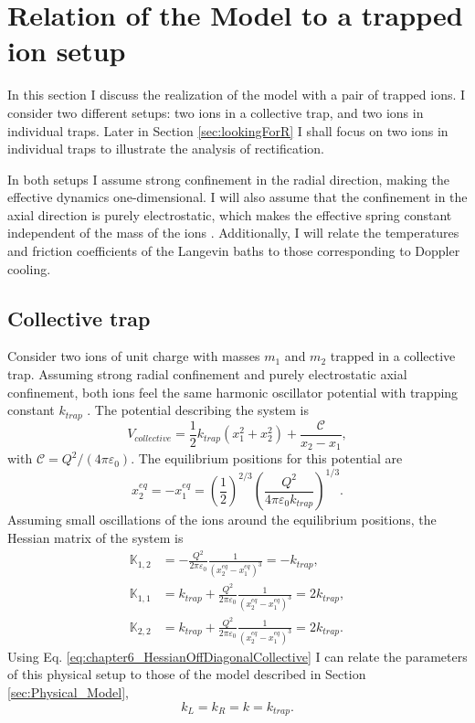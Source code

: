 \section{Relation of the Model to a trapped ion setup \label{sec:TrappedIonSetUp}}
%
In this section I discuss the realization of the model with  a pair of trapped ions. I consider two different setups: two ions in a collective trap, and two ions in individual traps. Later in Section \ref{sec:lookingForR} I shall focus on two ions in individual traps to illustrate the analysis of rectification.

In both setups I assume strong confinement in the radial direction, making the effective dynamics one-dimensional. I will also assume that the confinement in the axial direction is purely electrostatic, which makes the effective spring constant independent of the mass of the ions \cite{Leibfried2003}. Additionally, I will relate the temperatures and friction coefficients of the Langevin baths to those corresponding to Doppler cooling.
%
%
\subsection{Collective trap}
%
%
Consider two ions of unit charge with masses $m_1$ and $m_2$ trapped in a collective trap. Assuming strong radial confinement and purely electrostatic axial confinement, both ions feel the same harmonic oscillator potential with trapping constant $k_{trap}$ \cite{Leibfried2003}. The potential describing the system is
%
\begin{equation}
  V_{collective} = \frac{1}{2}k_{trap} \left( x_1^2 + x_2^2\right) + \frac{\mathcal{C}}{x_2-x_1},
\end{equation}
%
with $\mathcal{C}={Q^2}/({4\pi\varepsilon_0})$. The equilibrium positions for this potential are
%
\begin{equation}
  x_2^{eq} = -x_1^{eq} =
  \label{eq:chapter6_equilibriumPositionsCollectiveTrap}\left(\frac{1}{2}\right)^{2/3} \left(\frac{Q^2}{4\pi\varepsilon_0 k_{trap}}\right)^{1/3}.
\end{equation}
%
Assuming small oscillations of the ions around the equilibrium positions, the Hessian matrix of the system is
%
\begin{align}
  \mathbb{K}_{1,2} &= -\frac{Q^2}{2\pi\varepsilon_0}\frac{1}{(x_2^{eq}-x_1^{eq})^3} = -k_{trap},\nonumber
  \\
  \mathbb{K}_{1,1} &= k_{trap} + \frac{Q^2}{2\pi\varepsilon_0}\frac{1}{(x_2^{eq}-x_1^{eq})^3} = 2 k_{trap},\nonumber
  \\
  \mathbb{K}_{2,2} &= k_{trap} + \frac{Q^2}{2\pi\varepsilon_0}\frac{1}{(x_2^{eq}-x_1^{eq})^3} = 2 k_{trap}.
  \label{eq:chapter6_HessianOffDiagonalCollective}
\end{align}
%
Using Eq. \eqref{eq:chapter6_HessianOffDiagonalCollective} I can relate the parameters of this physical setup to those of the model described in Section \ref{sec:Physical_Model},
%
\begin{equation}
  k_L = k_R = k = k_{trap}.
\end{equation}
%
%
%
